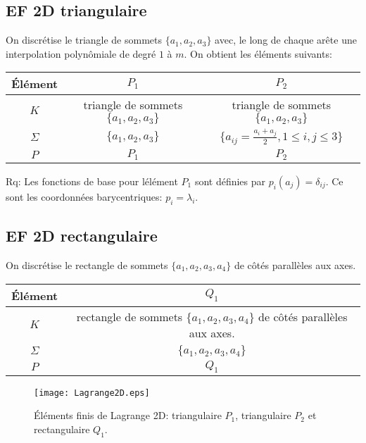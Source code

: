 \medskip
\subsection*{EF 2D triangulaire}

On discrétise le triangle de sommets $\{a_1, a_2, a_3\}$ avec, le long de chaque
arête une interpolation polynômiale de degré $1$ à $m$.
On obtient les éléments suivants:
\begin{center}
\begin{tabular}{c|cc}
Élément & $P_1$ & $P_2$ \\
\hline
$K$	      & triangle de sommets $\{a_1, a_2, a_3\}$ & triangle de sommets $\{a_1, a_2, a_3\}$\\
$\Sigma$   & $\{a_1, a_2, a_3\}$ & $\{a_{ij}=\frac{a_i+a_j}2, 1\le i,j\le 3\}$ \\
$P$            & $P_1$ & $P_2$ \\
\hline
\end{tabular}
\end{center}

Rq: Les fonctions de base pour lélément $P_1$ sont définies par $p_i(a_j) = \delta_{ij}$. 
Ce sont les coordonnées barycentriques: $p_i = \lambda_i$.

\medskip
\subsection*{EF 2D rectangulaire}

On discrétise le rectangle de sommets $\{a_1, a_2, a_3, a_4\}$ de côtés
parallèles aux axes.
\begin{center}
\begin{tabular}{c|c}
Élément & $Q_1$\\
\hline
$K$ & rectangle de sommets $\{a_1, a_2, a_3, a_4\}$ de côtés parallèles aux axes.\\
$\Sigma$ & $\{a_1, a_2, a_3, a_4\}$\\
$P$ & $Q_1$\\
\hline
\end{tabular}
\end{center}

\begin{figure}[ht]
\begin{center}
\texttt{[image: Lagrange2D.eps]}
\end{center}
\caption{\label{Lagrange2D} Éléments finis de Lagrange 2D: triangulaire $P_1$, triangulaire $P_2$ et rectangulaire $Q_1$.}
\end{figure}

